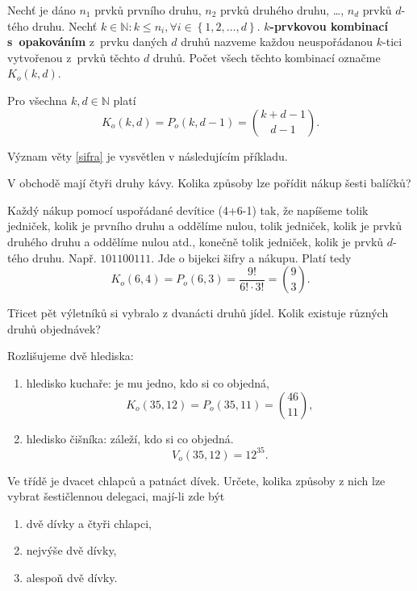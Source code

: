 \begin{definition}
    Nechť je dáno $n_1$ prvků prvního druhu, $n_2$ prvků druhého druhu, \dots,
    $n_d$ prvků $d$-tého druhu. Nechť $k\in \mathbb N\colon k\leq n_i, \forall i
    \in \left \{ 1,2,\dots,d \right \}$. \textbf{$k$-prvkovou kombinací s~opakováním}
    z~prvku daných $d$ druhů nazveme každou neuspořádanou $k$-tici vytvořenou z~prvků
    těchto $d$ druhů. Počet všech těchto kombinací označme $K_o(k,d).$
\end{definition}

\begin{veta}\label{sifra}
    Pro všechna $k,d \in \mathbb N$ platí
    $$K_o(k,d)=P_o(k,d-1)=\binom{k+d-1}{d-1}.$$
\end{veta}

\begin{pozn}
    Význam věty \ref{sifra} je vysvětlen v následujícím příkladu.
\end{pozn}

\begin{priklad}
V obchodě mají čtyři druhy kávy. Kolika způsoby lze pořídit nákup šesti balíčků?
\end{priklad}

\begin{reseni}
Každý nákup  pomocí uspořádané devítice (4+6-1) tak, že napíšeme
tolik jedniček, kolik je prvního druhu a oddělíme nulou, tolik jedniček, kolik
je prvků druhého druhu a oddělíme nulou atd., konečně tolik jedniček,
kolik je prvků $d$-tého druhu. Např. $101100111$. Jde o bijekci šifry a nákupu.
Platí tedy
$$K_o(6,4)=P_o(6,3)=\frac{9!}{6!\cdot 3!}=\binom{9}{3}.$$
\end{reseni}

\begin{priklad}
Třicet pět výletníků si vybralo z dvanácti druhů jídel. Kolik existuje
různých druhů objednávek?
\end{priklad}

\begin{reseni}
Rozlišujeme dvě hlediska:
\begin{enumerate}[$i.$]
\item hledisko kuchaře: je mu jedno, kdo si co objedná,
$$K_o(35,12)=P_o(35,11)=\binom{46}{11},$$
\item hledisko čišníka: záleží, kdo si co objedná.
$$V_o(35,12)=12^{35}.$$
\end{enumerate}
\end{reseni}

\begin{priklad}
Ve třídě je dvacet chlapců a patnáct dívek. Určete, kolika způsoby z nich lze vybrat
šestičlennou delegaci, mají-li zde být
\begin{enumerate}[$a.$]
\item dvě dívky a čtyři chlapci,
\item nejvýše dvě dívky,
\item alespoň dvě dívky.
\end{enumerate}
\end{priklad}

